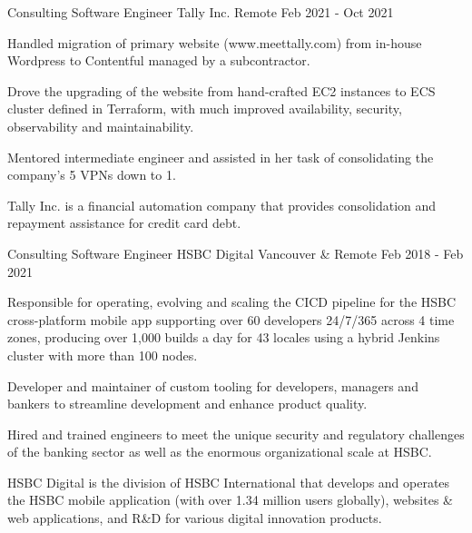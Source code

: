 

\begin{cventries}

  \cventrywithsummary
    {Consulting Software Engineer} %
    {Tally Inc.} %
    {Remote} %
    {Feb 2021 - Oct 2021} %
    {
      \begin{cvitems} %
        \item {Handled migration of primary website (www.meettally.com) from in-house Wordpress to Contentful managed by a subcontractor.}
        \item {Drove the upgrading of the website from hand-crafted EC2 instances to ECS cluster defined in Terraform, with much improved availability, security, observability and maintainability.}
        \item {Mentored intermediate engineer and assisted in her task of consolidating the company's 5 VPNs down to 1.}
      \end{cvitems}
    }
    {
      Tally Inc. is a financial automation company that provides consolidation and repayment assistance for credit card debt.
    }

  \cventrywithsummary
    {Consulting Software Engineer} %
    {HSBC Digital} %
    {Vancouver \& Remote} %
    {Feb 2018 - Feb 2021} %
    {
      \begin{cvitems} %
        \item {Responsible for operating, evolving and scaling the CICD pipeline for the HSBC cross-platform mobile app supporting over 60 developers 24/7/365 across 4 time zones, producing over 1,000 builds a day for 43 locales using a hybrid Jenkins cluster with more than 100 nodes.}
        \item {Developer and maintainer of custom tooling for developers, managers and bankers to streamline development and enhance product quality.}
        \item {Hired and trained engineers to meet the unique security and regulatory challenges of the banking sector as well as the enormous organizational scale at HSBC. }
      \end{cvitems}
    }
    {
      HSBC Digital is the division of HSBC International that develops and operates the HSBC mobile application (with over 1.34 million users globally), websites \& web applications, and R\&D for various digital innovation products.
    }


\end{cventries}
